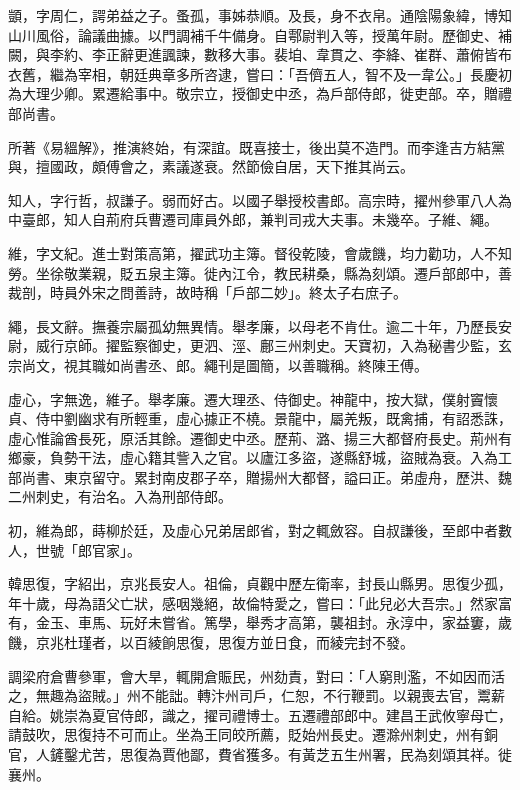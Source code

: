 \begin{pinyinscope}
 顗，字周仁，諤弟益之子。蚤孤，事姊恭順。及長，身不衣帛。通陰陽象緯，博知山川風俗，論議曲據。以門調補千牛備身。自鄠尉判入等，授萬年尉。歷御史、補闕，與李約、李正辭更進諷諫，數移大事。裴垍、韋貫之、李絳、崔群、蕭俯皆布衣舊，繼為宰相，朝廷典章多所咨逮，嘗曰：「吾儕五人，智不及一韋公。」長慶初為大理少卿。累遷給事中。敬宗立，授御史中丞，為戶部侍郎，徙吏部。卒，贈禮部尚書。



 所著《易縕解》，推演終始，有深誼。既喜接士，後出莫不造門。而李逢吉方結黨與，擅國政，頗傅會之，素議遂衰。然節儉自居，天下推其尚云。



 知人，字行哲，叔謙子。弱而好古。以國子舉授校書郎。高宗時，擢州參軍八人為中臺郎，知人自荊府兵曹遷司庫員外郎，兼判司戎大夫事。未幾卒。子維、繩。



 維，字文紀。進士對策高第，擢武功主簿。督役乾陵，會歲饑，均力勸功，人不知勞。坐徐敬業親，貶五泉主簿。徙內江令，教民耕桑，縣為刻頌。遷戶部郎中，善裁剖，時員外宋之問善詩，故時稱「戶部二妙」。終太子右庶子。



 繩，長文辭。撫養宗屬孤幼無異情。舉孝廉，以母老不肯仕。逾二十年，乃歷長安尉，威行京師。擢監察御史，更泗、涇、鄜三州刺史。天寶初，入為秘書少監，玄宗尚文，視其職如尚書丞、郎。繩刊是圖簡，以善職稱。終陳王傅。



 虛心，字無逸，維子。舉孝廉。遷大理丞、侍御史。神龍中，按大獄，僕射竇懷貞、侍中劉幽求有所輕重，虛心據正不橈。景龍中，屬羌叛，既禽捕，有詔悉誅，虛心惟論酋長死，原活其餘。遷御史中丞。歷荊、潞、揚三大都督府長史。荊州有鄉豪，負勢干法，虛心籍其訾入之官。以廬江多盜，遂縣舒城，盜賊為衰。入為工部尚書、東京留守。累封南皮郡子卒，贈揚州大都督，謚曰正。弟虛舟，歷洪、魏二州刺史，有治名。入為刑部侍郎。



 初，維為郎，蒔柳於廷，及虛心兄弟居郎省，對之輒斂容。自叔謙後，至郎中者數人，世號「郎官家」。



 韓思復，字紹出，京兆長安人。祖倫，貞觀中歷左衛率，封長山縣男。思復少孤，年十歲，母為語父亡狀，感咽幾絕，故倫特愛之，嘗曰：「此兒必大吾宗。」然家富有，金玉、車馬、玩好未嘗省。篤學，舉秀才高第，襲祖封。永淳中，家益窶，歲饑，京兆杜瑾者，以百綾餉思復，思復方並日食，而綾完封不發。



 調梁府倉曹參軍，會大旱，輒開倉賑民，州劾責，對曰：「人窮則濫，不如因而活之，無趣為盜賊。」州不能詘。轉汴州司戶，仁恕，不行鞭罰。以親喪去官，鬻薪自給。姚崇為夏官侍郎，識之，擢司禮博士。五遷禮部郎中。建昌王武攸寧母亡，請鼓吹，思復持不可而止。坐為王同皎所薦，貶始州長史。遷滁州刺史，州有銅官，人鏟鑿尤苦，思復為賈他鄙，費省獲多。有黃芝五生州署，民為刻頌其祥。徙襄州。




\end{pinyinscope}
